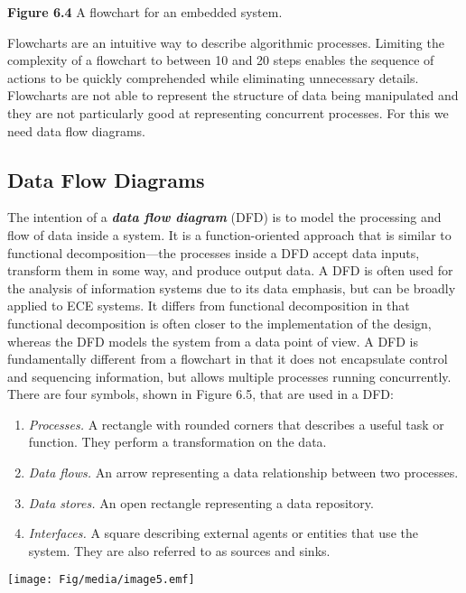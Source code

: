 \textbf{Figure 6.4} A flowchart for an embedded system.

Flowcharts are an intuitive way to describe algorithmic processes.
Limiting the complexity of a flowchart to between 10 and 20 steps
enables the sequence of actions to be quickly comprehended while
eliminating unnecessary details. Flowcharts are not able to represent
the structure of data being manipulated and they are not particularly
good at representing concurrent processes. For this we need data flow
diagrams.

\subsection{Data Flow Diagrams}\label{data-flow-diagrams}

The intention of a \emph{\textbf{data flow diagram}} (DFD) is to model
the processing and flow of data inside a system. It is a
function-oriented approach that is similar to functional
decomposition---the processes inside a DFD accept data inputs, transform
them in some way, and produce output data. A DFD is often used for the
analysis of information systems due to its data emphasis, but can be
broadly applied to ECE systems. It differs from functional decomposition
in that functional decomposition is often closer to the implementation
of the design, whereas the DFD models the system from a data point of
view. A DFD is fundamentally different from a flowchart in that it does
not encapsulate control and sequencing information, but allows multiple
processes running concurrently. There are four symbols, shown in Figure
6.5, that are used in a DFD:

\begin{enumerate}
\def\labelenumi{\arabic{enumi}.}
\item
  \emph{Processes.} A rectangle with rounded corners that describes a
  useful task or function. They perform a transformation on the data.
\item
  \emph{Data flows.} An arrow representing a data relationship between
  two processes.
\item
  \emph{Data stores.} An open rectangle representing a data repository.
\item
  \emph{Interfaces.} A square describing external agents or entities
  that use the system. They are also referred to as sources and sinks.
\end{enumerate}

\texttt{[image: Fig/media/image5.emf]}

